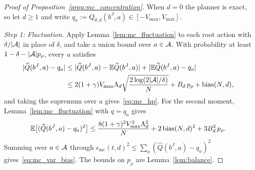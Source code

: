 \begin{proof}[Proof of Proposition~\ref{prop:mc_concentration}]
When $d=0$ the planner is exact, so let $d\ge1$ and write $q_a:=Q_{\theta,d}(b^J,a)\in[-V_{\max},V_{\max}]$.

\emph{Step 1: Fluctuation.}
Apply Lemma~\ref{lem:mc_fluctuation} to each root action with $\delta/|{\mathcal{A}}|$ in place of $\delta$, and take a union bound over $a\in{\mathcal{A}}$.
With probability at least $1-\delta-|{\mathcal{A}}|p_\rho$, every $a$ satisfies
\begin{align*}
|\widehat Q(b^J,a)-q_a|
&\le|\widehat Q(b^J,a)-\mathbb{E}\widehat Q(b^J,a)|+|\mathbb{E}\widehat Q(b^J,a)-q_a|\\
&\le2(1+\gamma)V_{\max}\Lambda_d\sqrt{\frac{2\log(2|{\mathcal{A}}|/\delta)}{N}}+B_d\,p_\rho+\mathrm{bias}(N,d),
\end{align*}
and taking the supremum over $a$ gives~\eqref{eq:mc_hp}.
For the second moment, Lemma~\ref{lem:mc_fluctuation} with $q=q_a$ gives
\[
\mathbb{E}\bigl[(\widehat Q(b^J,a)-q_a)^2\bigr]\le\frac{8(1+\gamma)^2V_{\max}^2\Lambda_d^2}{N}+2\,\mathrm{bias}(N,d)^2+3B_d^2\,p_\rho.
\]
Summing over $a\in{\mathcal{A}}$ through $\epsilon_{\mathrm{mc}}(t,d)^2\le\sum_a(\widehat Q(b^J,a)-q_a)^2$ gives~\eqref{eq:mc_var_bias}.
The bounds on $p_\rho$ are Lemma~\ref{lem:balance}.


\end{proof}
